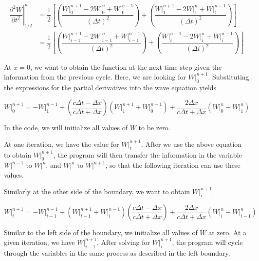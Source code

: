\documentclass{article}
\begin{document}
\begin{align}
\left . \dfrac{\partial^2 W}{\partial t^2} \right |^n_{1/2} &= \dfrac{1}{2} \left [ \left ( \dfrac{W \big|^{n+1}_{0} - 2 W \big|^{n}_{0} + W \big |^{n-1}_{0}}{(\Delta t)^2} \right ) + \left ( \dfrac{W \big|^{n+1}_{1} - 2 W \big|^{n}_{1} + W \big |^{n-1}_{1}}{(\Delta t)^2} \right ) \right ] 
\\
&= \dfrac{1}{2} \left [ \left ( \dfrac{W \big|^{n+1}_{i-1} - 2 W \big|^{n}_{i-1} + W \big |^{n-1}_{i-1}}{(\Delta t)^2} \right ) + \left ( \dfrac{W \big|^{n+1}_{i} - 2 W \big|^{n}_{i} + W \big |^{n-1}_{i}}{(\Delta t)^2} \right ) \right ]
\end{align}

    At \(x=0\), we want to obtain the function at the next time step given
the information from the previous cycle. Here, we are looking for
\(W \Big|^{n+1}_{0}\). Substituting the expressions for the partial
derivatives into the wave equation yields

\begin{equation}
W \big|^{n+1}_{0} = - W \big|_{1}^{n-1} + \left(\dfrac{c \Delta t - \Delta x}{c \Delta t + \Delta x}\right )\left (W \big|_{1}^{n+1}+W \big|_{0}^{n-1}\right )+\dfrac{2 \Delta x}{c \Delta t + \Delta x}\left( {W \big|^{n}_{0}}+ {W \big|^{n}_{1}}\right )
\end{equation}

In the code, we will initialize all values of \(W\) to be zero.

At one iteration, we have the value for \(W \Big|_{1}^{n+1}\). After we
use the above equation to obtain \(W \Big|^{n+1}_{0}\), the program will
then transfer the information in the variable \(W \Big|^{n-1}\) to
\(W \Big|^{n}\), and \(W \Big|^{n}\) to \(W \Big|^{n+1}\), so that the
following iteration can use these values.

    Similarly at the other side of the boundary, we want to obtain
\(W \Big|_{i}^{n+1}\).

\begin{equation}
W \big|_{i}^{n+1} = - W \big|_{i-1}^{n-1} + \left (W \big|_{i-1}^{n+1} + W \big |^{n-1}_{i} \right ) \left(\dfrac{c \Delta t - \Delta x}{c \Delta t + \Delta x}\right) + \dfrac{2 \Delta x}{c \Delta t + \Delta x}\left(W \big|^{n}_{i} + W \big|^{n}_{i-1} \right) 
\end{equation}

Similar to the left side of the boundary, we initialize all values of
\(W\) at zero. At a given iteration, we have \(W \Big |_{i-1}^{n+1}\).
After solving for \(W \Big|_{i}^{n+1}\), the program will cycle through
the variables in the same process as described in the left boundary.
\end{document}
